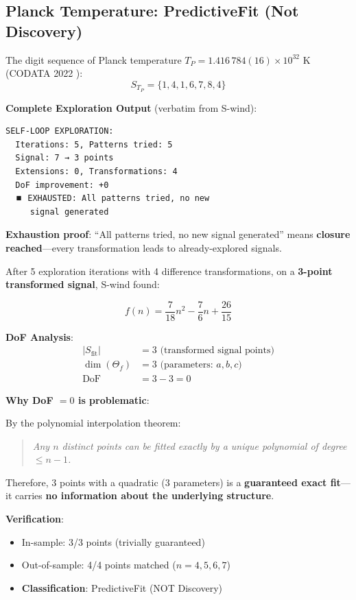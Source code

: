 \documentclass[twocolumn,showpacs,preprintnumbers,amsmath,amssymb,prl]{revtex4-2}
\begin{document}
\subsection{Planck Temperature: PredictiveFit (Not Discovery)}

The digit sequence of Planck temperature $T_P = 1.416\,784(16) \times 10^{32}$ K (CODATA 2022 \cite{nist_tp}):
\begin{equation}
    S_{T_P} = \{1, 4, 1, 6, 7, 8, 4\}
\end{equation}

\textbf{Complete Exploration Output} (verbatim from S-wind):

\begin{verbatim}
SELF-LOOP EXPLORATION:
  Iterations: 5, Patterns tried: 5
  Signal: 7 → 3 points
  Extensions: 0, Transformations: 4
  DoF improvement: +0
  ⏹️ EXHAUSTED: All patterns tried, no new
     signal generated
\end{verbatim}

\textbf{Exhaustion proof}: ``All patterns tried, no new signal generated'' means \textbf{closure reached}---every transformation leads to already-explored signals.

After 5 exploration iterations with 4 difference transformations, on a \textbf{3-point transformed signal}, S-wind found:

\begin{equation}
\boxed{f(n) = \frac{7}{18}n^2 - \frac{7}{6}n + \frac{26}{15}}
\end{equation}

\textbf{DoF Analysis}:
\begin{align}
    |S_{\text{fit}}| &= 3 \text{ (transformed signal points)} \\
    \dim(\Theta_f) &= 3 \text{ (parameters: } a, b, c \text{)} \\
    \text{DoF} &= 3 - 3 = 0
\end{align}

\textbf{Why DoF $= 0$ is problematic}:

By the polynomial interpolation theorem:
\begin{quote}
\textit{Any $n$ distinct points can be fitted exactly by a unique polynomial of degree $\leq n-1$.}
\end{quote}

Therefore, 3 points with a quadratic (3 parameters) is a \textbf{guaranteed exact fit}---it carries \textbf{no information about the underlying structure}.

\textbf{Verification}:
\begin{itemize}
    \item In-sample: 3/3 points (trivially guaranteed)
    \item Out-of-sample: 4/4 points matched ($n = 4, 5, 6, 7$)
    \item \textbf{Classification}: PredictiveFit (NOT Discovery)
\end{itemize}
\end{document}
